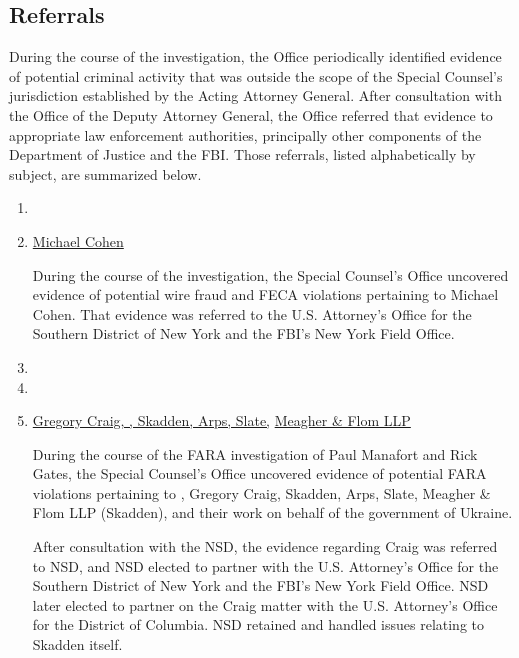 \subsection{Referrals}

During the course of the investigation, the Office periodically identified evidence of potential criminal activity that was outside the scope of the Special Counsel's jurisdiction established by the Acting Attorney General.
After consultation with the Office of the Deputy Attorney General, the Office referred that evidence to appropriate law enforcement authorities, principally other components of the Department of Justice and the FBI\null.
Those referrals, listed alphabetically by subject, are summarized below.

\begin{enumerate}[1.]

    \item {}


    \item \underline{Michael Cohen}

During the course of the investigation, the Special Counsel's Office uncovered evidence of potential wire fraud and FECA violations pertaining to Michael Cohen.
That evidence was referred to the U.S. Attorney's Office for the Southern District of New York and the FBI's New York Field Office.

    \item {}


    \item {}


    \item \underline{Gregory Craig, ,  Skadden, Arps, Slate,}\hfil\break
	    \underline{Meagher \& Flom LLP}

During the course of the FARA investigation of Paul Manafort and Rick Gates, the Special Counsel's Office uncovered evidence of potential FARA violations pertaining to , Gregory Craig, Skadden, Arps, Slate, Meagher \& Flom LLP (Skadden), and their work on behalf of the government of Ukraine.

After consultation with the NSD, the evidence regarding Craig  was referred to NSD, and NSD elected to partner with the U.S. Attorney's Office for the Southern District of New York and the FBI's New York Field Office.
NSD later elected to partner on the Craig matter with the U.S. Attorney's Office for the District of Columbia.
NSD retained and handled issues relating to Skadden itself.


\end{enumerate}
